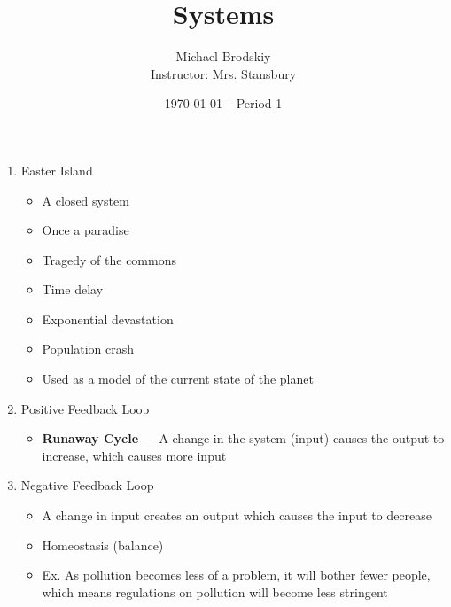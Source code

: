 \documentclass[12pt]{article}
\title{Systems}
\date{\today $-$ Period 1}
\author{Michael Brodskiy\\ \small Instructor: Mrs. Stansbury}
\begin{document}
\maketitle

\begin{enumerate}

  \item Easter Island

    \begin{itemize}

      \item A closed system

      \item Once a paradise

      \item Tragedy of the commons

      \item Time delay

      \item Exponential devastation

      \item Population crash

      \item Used as a model of the current state of the planet

    \end{itemize}

  \item Positive Feedback Loop

    \begin{itemize}

      \item \textbf{Runaway Cycle} — A change in the system (input) causes the output to increase, which causes more input

    \end{itemize}

  \item Negative Feedback Loop

    \begin{itemize}

      \item A change in input creates an output which causes the input to decrease

      \item Homeostasis (balance)

      \item Ex. As pollution becomes less of a problem, it will bother fewer people, which means regulations on pollution will become less stringent


\end{itemize}
\end{enumerate}
\end{document}
